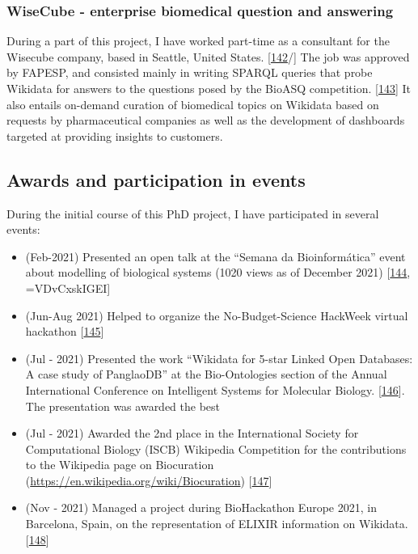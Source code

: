 \hypertarget{wisecube---enterprise-biomedical-question-and-answering}{%
\subsubsection{WiseCube - enterprise biomedical question and answering}\label{wisecube---enterprise-biomedical-question-and-answering}}

During a part of this project, I have worked part-time as a consultant for the Wisecube company, based in Seattle, United States. {[}\protect\hyperlink{ref-gdYsBE7d}{142}/{]}
The job was approved by FAPESP, and consisted mainly in writing SPARQL queries that probe Wikidata for answers to the questions posed by the BioASQ competition. {[}\protect\hyperlink{ref-rkXotO9x}{143}{]}
It also entails on-demand curation of biomedical topics on Wikidata based on requests by pharmaceutical companies as well as the development of dashboards targeted at providing insights to customers.

\hypertarget{awards-and-participation-in-events}{%
\subsection{Awards and participation in events}\label{awards-and-participation-in-events}}

During the initial course of this PhD project, I have participated in several events:

\begin{itemize}
\tightlist
\item
  (Feb-2021) Presented an open talk at the ``Semana da Bioinformática'' event about modelling of biological systems (1020 views as of December 2021) {[}\protect\hyperlink{ref-1C9uHr1Zk}{144}, =VDvCxskIGEI{]}
\item
  (Jun-Aug 2021) Helped to organize the No-Budget-Science HackWeek virtual hackathon {[}\protect\hyperlink{ref-12LOzmXRs}{145}{]}
\item
  (Jul - 2021) Presented the work ``Wikidata for 5-star Linked Open Databases: A case study of PanglaoDB'' at the Bio-Ontologies section of the Annual International Conference on Intelligent Systems for Molecular Biology. {[}\protect\hyperlink{ref-SALI6Ywb}{146}{]}. The presentation was awarded the best
\item
  (Jul - 2021) Awarded the 2nd place in the International Society for Computational Biology (ISCB) Wikipedia Competition for the contributions to the Wikipedia page on Biocuration (\url{https://en.wikipedia.org/wiki/Biocuration}) {[}\protect\hyperlink{ref-IJG65hFm}{147}{]}
\item
  (Nov - 2021) Managed a project during BioHackathon Europe 2021, in Barcelona, Spain, on the representation of ELIXIR information on Wikidata. {[}\protect\hyperlink{ref-14Wi842eZ}{148}{]}
\end{itemize}

